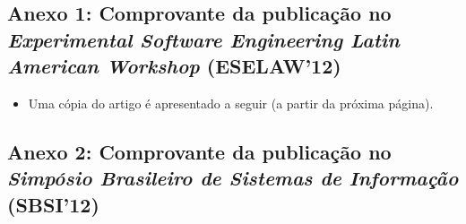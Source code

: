 \subsection*{Anexo 1: Comprovante da publicação no \emph{Experimental Software Engineering Latin American Workshop} (ESELAW'12)} \label{anexo:comprovante_ESELAW}


\begin{figure}[!h]
 \centering
 \label{fig:comprovante_vmil}
\end{figure}

\begin{itemize}
	\item Uma cópia do artigo é apresentado a seguir (a partir da próxima página).
\end{itemize}
\clearpage



\subsection*{Anexo 2: Comprovante da publicação no \emph{Simpósio Brasileiro de Sistemas de Informação} (SBSI'12)} \label{anexo:comprovante_SBSI}

